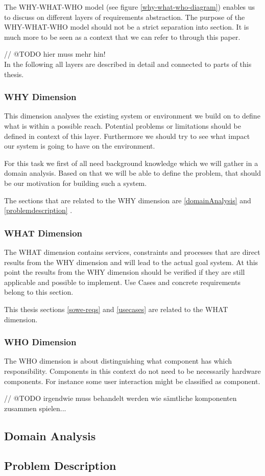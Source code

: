 The WHY-WHAT-WHO model (see figure \ref{why-what-who-diagram}) enables us to discuss on different layers of requirements abstraction. The purpose of the WHY-WHAT-WHO model should not be a strict separation into section. It is much more to be seen as a context that we can refer to through this paper.

// @TODO hier muss mehr hin! \\

In the following all layers are described in detail and connected to parts of this thesis. 

\subsubsection{WHY Dimension}
This dimension analyses the existing system or environment 
we build on to define what is within a possible reach. Potential problems or limitations should be defined in context of this layer. Furthermore we should try to see what impact our system is going to have on the environment. 

For this task we first of all need background knowledge which we will gather in a domain analysis. Based on that we will be able to define the problem, that should be our motivation for building such a system. 

The sections that are related to the WHY dimension are \ref{domainAnalysis}  and \ref{problemdescription} .

\subsubsection{WHAT Dimension}

The WHAT dimension contains services, constraints and processes that are direct results from the WHY dimension and will lead to the actual goal system. At this point the results from the WHY dimension should be verified if they are still applicable and possible to implement. Use Cases and concrete requirements belong to this section. 

This thesis sections \ref{sowe-reqs}  and \ref{usecases}  are related to the WHAT dimension.

\subsubsection{WHO Dimension}

The WHO dimension is about distinguishing what component has which responsibility. Components in this context do not need to be necessarily hardware components. For instance some user interaction might be classified as component.

// @TODO irgendwie muss behandelt werden wie sämtliche komponenten zusammen spielen... \\

\subsection{Domain Analysis}


\subsection{Problem Description}




